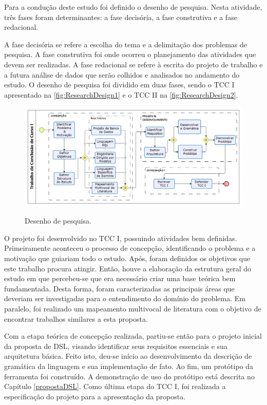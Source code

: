 Para a condução deste estudo foi definido o desenho de pesquisa. 
Nesta atividade, três fases foram determinantes: a fase decisória, a fase construtiva e a fase redacional.

A fase decisória se refere a escolha do tema e a delimitação dos problemas de pesquisa. 
A fase construtiva foi onde ocorreu o planejamento das atividades que devem ser realizadas. 
A fase redacional se refere à escrita do projeto de trabalho e a futura análise de dados que serão colhidos e analisados no andamento do estudo. O desenho de pesquisa foi dividido em duas fases, sendo o \ac{TCC} I apresentado na \autoref{fig:ResearchDesign1} e o \ac{TCC} II na \autoref{fig:ResearchDesign2}.

\begin{figure}[!htb]
	\centering
	\caption{Desenho de pesquisa.}
		\includegraphics[width=1\textwidth]{img/DesenhoPesquisa1.png}
	\label{fig:ResearchDesign1}
\end{figure}

O projeto foi desenvolvido no \ac{TCC} I, possuindo atividades bem definidas. 
Primeiramente aconteceu o processo de concepção, identificando o problema e a motivação que guiariam todo o estudo. 
Após, foram definidos os objetivos que este trabalho procura atingir. 
Então, houve a elaboração da estrutura geral do estudo em que percebeu-se que era necessário criar uma base teórica bem fundamentada. 
Desta forma, foram caracterizadas as principais áreas que deveriam ser investigadas para o entendimento do domínio do problema. 
Em paralelo, foi realizado um mapeamento multivocal de literatura com o objetivo de encontrar trabalhos similares a esta proposta. 

Com a etapa teórica de concepção realizada, partiu-se então para o projeto inicial da proposta de \ac{DSL}, visando identificar seus requisitos essenciais e sua arquitetura básica. 
Feito isto, deu-se início ao desenvolvimento da descrição de gramática da linguagem e sua implementação de fato. 
Ao fim, um protótipo da ferramenta foi construído. 
A demonstração de uso do protótipo está descrita no Capítulo \autoref{propostaDSL}. 
Como última etapa do \ac{TCC} I, foi realizada a especificação do projeto para a apresentação da proposta.

